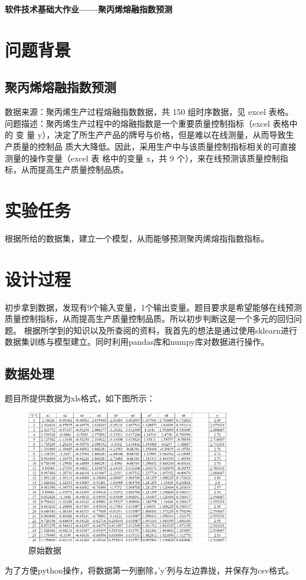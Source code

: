 \documentclass{source/Experiment}
\title{}
\date{\today}
\begin{document}
    \begin{center}
        \vspace{0.5cm}
        \bfseries\Large{软件技术基础大作业——聚丙烯熔融指数预测}
    \end{center}

    \section{问题背景}
        \subsection{聚丙烯熔融指数预测}
        数据来源：聚丙烯生产过程熔融指数数据，共 150 组时序数据，见 excel 表格。 问题描述：聚丙烯生产过程中的熔融指数是一个重要质量控制指标（excel 表格中的 变 量 y），决定了所生产产品的牌号与价格，但是难以在线测量，从而导致生产质量的控制品 质大大降低。因此，采用生产中与该质量控制指标相关的可直接测量的操作变量（excel 表 格中的变量 x，共 9 个），来在线预测该质量控制指标，从而提高生产质量控制品质。

    \section{实验任务}
    
        根据所给的数据集，建立一个模型，从而能够预测聚丙烯熔指指数指标。

    \section{设计过程}
        初步拿到数据，发现有9个输入变量，1个输出变量。题目要求是希望能够在线预测质量控制指标，从而提高生产质量控制品质。所以初步判断这是一个多元的回归问题。
        根据所学到的知识以及所查阅的资料，我首先的想法是通过使用sklearn进行数据集训练与模型建立。同时利用pandas库和numpy库对数据进行操作。
        \subsection{数据处理}
            题目所提供数据为xls格式，如下图所示：
            \begin{figure}[H]
                \centering
                \includegraphics[width = 0.8\textwidth]{原始数据}
                \caption{原始数据}
            \end{figure}
            为了方便python操作，将数据第一列删除，'y'列与左边靠拢，并保存为csv格式。
\end{document}
